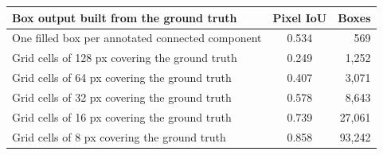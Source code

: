 \begin{tabular}{@{} l c r @{}}
\toprule
\textbf{Box output built from the ground truth} & \textbf{Pixel IoU} & \textbf{Boxes} \\
\midrule
One filled box per annotated connected component & 0.534 & 569 \\
Grid cells of 128 px covering the ground truth & 0.249 & 1,252 \\
Grid cells of 64 px covering the ground truth & 0.407 & 3,071 \\
Grid cells of 32 px covering the ground truth & 0.578 & 8,643 \\
Grid cells of 16 px covering the ground truth & 0.739 & 27,061 \\
Grid cells of 8 px covering the ground truth & 0.858 & 93,242 \\
\bottomrule
\end{tabular}
